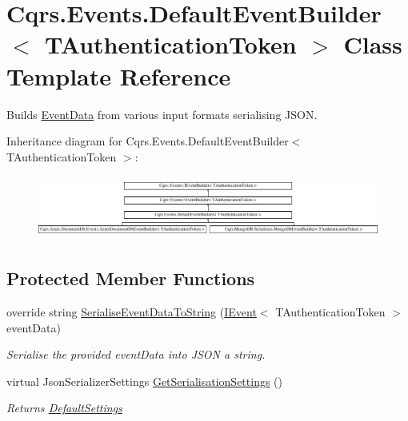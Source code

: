 \hypertarget{classCqrs_1_1Events_1_1DefaultEventBuilder}{}\section{Cqrs.\+Events.\+Default\+Event\+Builder$<$ T\+Authentication\+Token $>$ Class Template Reference}
\label{classCqrs_1_1Events_1_1DefaultEventBuilder}


Builds \hyperlink{classCqrs_1_1Events_1_1EventData}{Event\+Data} from various input formats serialising J\+S\+ON.  


Inheritance diagram for Cqrs.\+Events.\+Default\+Event\+Builder$<$ T\+Authentication\+Token $>$\+:\begin{figure}[H]
\begin{center}
\leavevmode
\includegraphics[height=2.117202cm]{classCqrs_1_1Events_1_1DefaultEventBuilder}
\end{center}
\end{figure}
\subsection*{Protected Member Functions}
\begin{DoxyCompactItemize}
\item 
override string \hyperlink{classCqrs_1_1Events_1_1DefaultEventBuilder_afb73a13003a94135e5c97436e7e78e13_afb73a13003a94135e5c97436e7e78e13}{Serialise\+Event\+Data\+To\+String} (\hyperlink{interfaceCqrs_1_1Events_1_1IEvent}{I\+Event}$<$ T\+Authentication\+Token $>$ event\+Data)
\begin{DoxyCompactList}\small\item\em Serialise the provided {\itshape event\+Data}  into J\+S\+ON a string. \end{DoxyCompactList}\item 
virtual Json\+Serializer\+Settings \hyperlink{classCqrs_1_1Events_1_1DefaultEventBuilder_a49be2758fa32166f1b95e8c0eb9355d1_a49be2758fa32166f1b95e8c0eb9355d1}{Get\+Serialisation\+Settings} ()
\begin{DoxyCompactList}\small\item\em Returns \hyperlink{classCqrs_1_1Events_1_1DefaultEventBuilder_aabead59863bacfed527d85ea789ab881_aabead59863bacfed527d85ea789ab881}{Default\+Settings} \end{DoxyCompactList}\end{DoxyCompactItemize}
